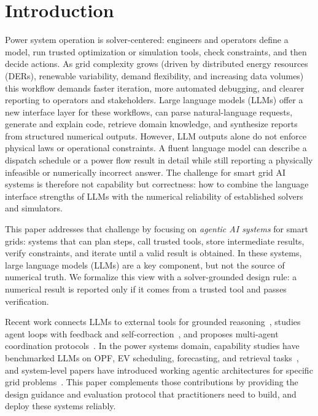 \documentclass[journal,onecolumn]{IEEEtran} %
\begin{document}
\section{Introduction}
\label{sec:intro}
Power system operation is solver-centered: engineers and operators define a model, run trusted optimization or simulation tools, check constraints, and then decide actions. As grid complexity grows (driven by distributed energy resources (DERs), renewable variability, demand flexibility, and increasing data volumes) this workflow demands faster iteration, more automated debugging, and clearer reporting to operators and stakeholders. Large language models (LLMs) offer a new interface layer for these workflows, can parse natural-language requests, generate and explain code, retrieve domain knowledge, and synthesize reports from structured numerical outputs. However, LLM outputs alone do not enforce physical laws or operational constraints. A fluent language model can describe a dispatch schedule or a power flow result in detail while still reporting a physically infeasible or numerically incorrect answer. The challenge for smart grid AI systems is therefore not capability but correctness: how to combine the language interface strengths of LLMs with the numerical reliability of established solvers and simulators.

This paper addresses that challenge by focusing on \emph{agentic AI systems} for smart grids: systems that can plan steps, call trusted tools, store intermediate results, verify constraints, and iterate until a valid result is obtained. In these systems, large language models (LLMs) are a key component, but not the source of numerical truth. We formalize this view with a solver-grounded design rule: a numerical result is reported only if it comes from a trusted tool and passes verification.


Recent work connects LLMs to external tools for grounded reasoning~\cite{yao2023react,schick2023toolformer}, studies agent loops with feedback and self-correction~\cite{shinn2023reflexion}, and proposes multi-agent coordination protocols~\cite{wu2023autogen}. In the power systems domain, capability studies have benchmarked LLMs on OPF, EV scheduling, forecasting, and retrieval tasks~\cite{huang2024foundation,majumder2024electric}, and system-level papers have introduced working agentic architectures for specific grid problems~\cite{jin2025gridmind,zhang2025gridagent,chen2025xgridagent,zhang2025poweragent,jia2025feedback}. This paper complements those contributions by providing the design guidance and evaluation protocol that practitioners need to build, and deploy these systems reliably.
\end{document}

